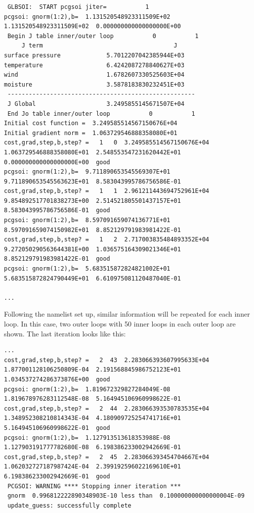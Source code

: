 \begin{enumerate}
\begin{tiny}
\begin{verbatim}
 GLBSOI:  START pcgsoi jiter=           1
pcgsoi: gnorm(1:2),b=  1.131520548923311509E+02  1.131520548923311509E+02  0.000000000000000000E+00
 Begin J table inner/outer loop           0           1
     J term                                     J
surface pressure             5.7012207042385944E+03
temperature                  6.4242087278840627E+03
wind                         1.6782607330525603E+04
moisture                     3.5878183830232451E+03
 -----------------------------------------------------
 J Global                    3.2495855145671507E+04
 End Jo table inner/outer loop           0           1
Initial cost function =  3.249585514567150676E+04
Initial gradient norm =  1.063729546888358080E+01
cost,grad,step,b,step? =   1   0  3.249585514567150676E+04  1.063729546888358080E+01  2.548553547231620442E+01  0.000000000000000000E+00  good
pcgsoi: gnorm(1:2),b=  9.711890653545569307E+01  9.711890653545563623E+01  8.583043995786756586E-01
cost,grad,step,b,step? =   1   1  2.961211443694752961E+04  9.854892517701838273E+00  2.514521805501437157E+01  8.583043995786756586E-01  good
pcgsoi: gnorm(1:2),b=  8.597091659074136771E+01  8.597091659074150982E+01  8.852129791983981422E-01
cost,grad,step,b,step? =   1   2  2.717003835484893352E+04  9.272050290563644381E+00  1.036575164309021346E+01  8.852129791983981422E-01  good
pcgsoi: gnorm(1:2),b=  5.683515872824821002E+01  5.683515872824790449E+01  6.610975081120487040E-01

...
\end{verbatim}
\end{tiny}

Following the namelist set up, similar information will be repeated for each inner loop.  In this case, two outer loops with 50 inner loops in each outer loop are shown.  The last iteration looks like this:

\begin{tiny}
\begin{verbatim}
...
cost,grad,step,b,step? =   2  43  2.283066393607995633E+04  1.877001128106250809E-04  2.191568845986752123E+01  1.034537274286373876E+00  good
pcgsoi: gnorm(1:2),b=  1.819672329827284049E-08  1.819678976283112548E-08  5.164945106960998622E-01
cost,grad,step,b,step? =   2  44  2.283066393530783535E+04  1.348952308210814343E-04  4.180909725254741716E+01  5.164945106960998622E-01  good
pcgsoi: gnorm(1:2),b=  1.127913513618353988E-08  1.127903191777782680E-08  6.198386233002942669E-01
cost,grad,step,b,step? =   2  45  2.283066393454704667E+04  1.062032727187987424E-04  2.399192596022169610E+01  6.198386233002942669E-01  good
 PCGSOI: WARNING **** Stopping inner iteration ***
 gnorm  0.996812222890348903E-10 less than  0.100000000000000004E-09
 update_guess: successfully complete
\end{verbatim}
\end{tiny}


\end{enumerate}
